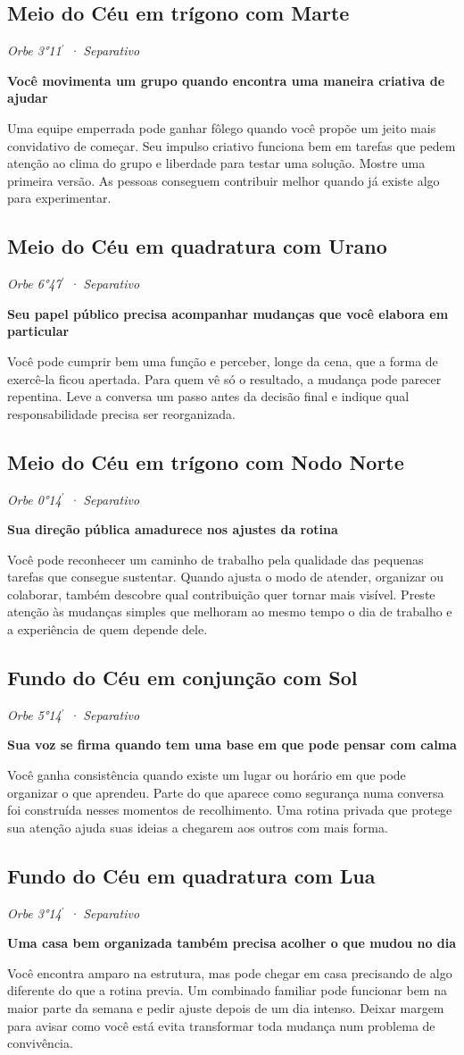 \documentclass[11pt,a4paper]{article}
\newcommand{\leitura}[3]{\subsection{#1}\textit{#2}\par #3}
\newcommand{\subtituloleitura}[1]{\textbf{#1}\par\nopagebreak[4]}
\begin{document}
\leitura{Meio do Céu em trígono com Marte}{Orbe 3°11\ensuremath{^{\prime}} · Separativo}{
\subtituloleitura{Você movimenta um grupo quando encontra uma maneira criativa de ajudar}
Uma equipe emperrada pode ganhar fôlego quando você propõe um jeito mais convidativo de começar. Seu impulso criativo funciona bem em tarefas que pedem atenção ao clima do grupo e liberdade para testar uma solução. Mostre uma primeira versão. As pessoas conseguem contribuir melhor quando já existe algo para experimentar.
}

\leitura{Meio do Céu em quadratura com Urano}{Orbe 6°47\ensuremath{^{\prime}} · Separativo}{
\subtituloleitura{Seu papel público precisa acompanhar mudanças que você elabora em particular}
Você pode cumprir bem uma função e perceber, longe da cena, que a forma de exercê-la ficou apertada. Para quem vê só o resultado, a mudança pode parecer repentina. Leve a conversa um passo antes da decisão final e indique qual responsabilidade precisa ser reorganizada.
}

\leitura{Meio do Céu em trígono com Nodo Norte}{Orbe 0°14\ensuremath{^{\prime}} · Separativo}{
\label{aspecto:mc-nodo}\subtituloleitura{Sua direção pública amadurece nos ajustes da rotina}
Você pode reconhecer um caminho de trabalho pela qualidade das pequenas tarefas que consegue sustentar. Quando ajusta o modo de atender, organizar ou colaborar, também descobre qual contribuição quer tornar mais visível. Preste atenção às mudanças simples que melhoram ao mesmo tempo o dia de trabalho e a experiência de quem depende dele.
}

\leitura{Fundo do Céu em conjunção com Sol}{Orbe 5°14\ensuremath{^{\prime}} · Separativo}{
\subtituloleitura{Sua voz se firma quando tem uma base em que pode pensar com calma}
Você ganha consistência quando existe um lugar ou horário em que pode organizar o que aprendeu. Parte do que aparece como segurança numa conversa foi construída nesses momentos de recolhimento. Uma rotina privada que protege sua atenção ajuda suas ideias a chegarem aos outros com mais forma.
}

\leitura{Fundo do Céu em quadratura com Lua}{Orbe 3°14\ensuremath{^{\prime}} · Separativo}{
\subtituloleitura{Uma casa bem organizada também precisa acolher o que mudou no dia}
Você encontra amparo na estrutura, mas pode chegar em casa precisando de algo diferente do que a rotina previa. Um combinado familiar pode funcionar bem na maior parte da semana e pedir ajuste depois de um dia intenso. Deixar margem para avisar como você está evita transformar toda mudança num problema de convivência.
}
\end{document}
